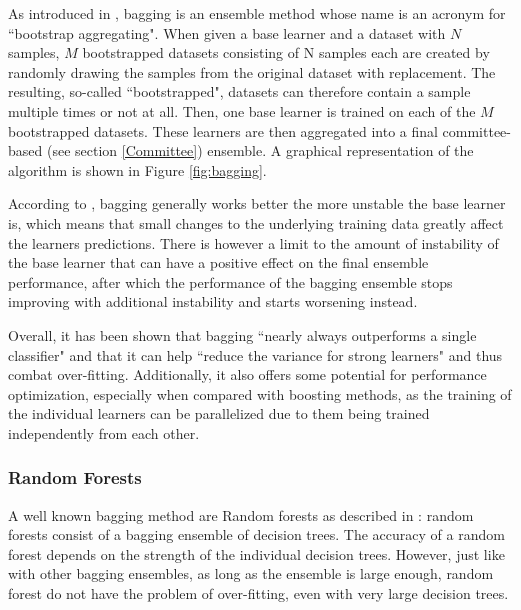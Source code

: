 As introduced in \citep{Breiman.1996}, bagging is an ensemble method whose name is an acronym for ``bootstrap aggregating". When given a base learner and a dataset with $N$ samples, $M$ bootstrapped datasets consisting of N samples each are created by randomly drawing the samples from the original dataset with replacement. The resulting, so-called ``bootstrapped", datasets can therefore contain a sample multiple times or not at all. Then, one base learner is trained on each of the $M$ bootstrapped datasets. These learners are then aggregated into a final committee-based (see section \ref{Committee}) ensemble.
A graphical representation of the algorithm is shown in Figure \ref{fig:bagging}.

According to \citep{Breiman.1996}, bagging generally works better the more unstable the base learner is, which means that small changes to the underlying training data greatly affect the learners predictions. There is however a limit to the amount of instability of the base learner that can have a positive effect on the final ensemble performance, after which the performance of the bagging ensemble stops improving with additional instability and starts worsening instead.

Overall, it has been shown that bagging ``nearly always outperforms a single classifier" \citep{RichardMaclin.} and that it can help ``reduce the variance for strong learners" \citep{Ju.2018} and thus combat over-fitting. Additionally, it also offers some potential for performance optimization, especially when compared with boosting methods, as the training of the individual learners can be parallelized due to them being trained independently from each other.

\subsubsection{Random Forests}

A well known bagging method are Random forests as described in \citep{LEOBREIMAN.}: random forests consist of a bagging ensemble of decision trees. The accuracy of a random forest depends on the strength of the individual decision trees. However, just like with other bagging ensembles, as long as the ensemble is large enough, random forest do not have the problem of over-fitting, even with very large decision trees. 

